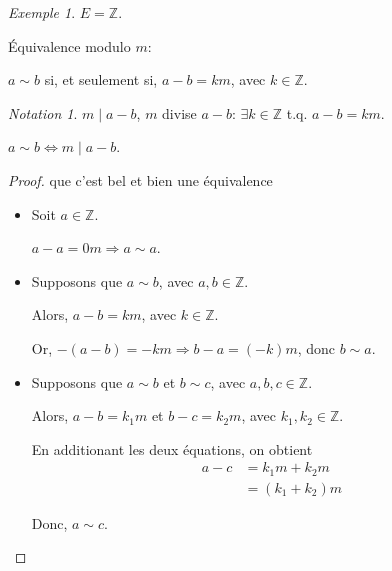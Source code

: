 \documentclass{report}
\newcommand*{\entiers}{\mathbb{Z}}
\theoremstyle{definition}
\theoremstyle{remark}
\newtheorem*{exem}{Exemple}
\newtheorem*{nota}{Notation}
\begin{document}
	
	\begin{exem}
		$E=\entiers$.

		\'Equivalence modulo $m$:

		$a \sim b$ si, et seulement si, $a-b=km$, avec $k \in \entiers$.
		\begin{nota}
			$m \mid a-b$, $m$ divise $a-b$: $\exists k \in \entiers$ t.q. $a-b=km$.
		\end{nota}

		$a \sim b \Longleftrightarrow m \mid a-b$.
		\begin{proof}
			que c'est bel et bien une \'equivalence
			\begin{itemize}
				\item[(Refl)] Soit $a \in \entiers$.

				$a-a=0m \Rightarrow a \sim a$.
				\item[(Sym)] Supposons que $a \sim b$, avec $a,b \in \entiers$.

				Alors, $a-b=km$, avec $k \in \entiers$.

				Or, $-(a-b)=-km \Rightarrow b-a=(-k)m$, donc $b \sim a$.
				\item[(Trans)] Supposons que $a \sim b$ et $b \sim c$, avec $a,b,c \in \entiers$.

				Alors, $a-b=k_1m$ et $b-c=k_2m$, avec $k_1,k_2 \in \entiers$.

				En additionant les deux \'equations, on obtient
				\begin{align*}
					a-c&= k_1m+k_2m\\
					&= (k_1+k_2)m
				\end{align*}

				Donc, $a \sim c$.
			\end{itemize}
		\end{proof}


\end{exem}
\end{document}
